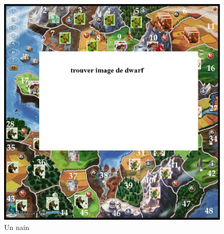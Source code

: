 \begin{figure}[ht!]
\centering
\includegraphics[scale=0.10]{img/dwarf.jpg}
\caption{Un nain}
\end{figure}
